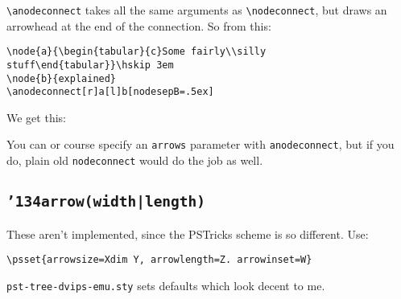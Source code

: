 \documentclass[12pt]{article}
\def\pstricks{PSTricks}
\def\bck{\char'134}
\begin{document}
\verb&\anodeconnect& takes all the same arguments as \verb&\nodeconnect&,
but draws an arrowhead at the end of the connection.  So from this:
\begin{example}
\begin{verbatim}
\node{a}{\begin{tabular}{c}Some fairly\\silly stuff\end{tabular}}\hskip 3em
\node{b}{explained}
\anodeconnect[r]a[l]b[nodesepB=.5ex]
\end{verbatim}
\end{example}
We get this:
You can or course specify an {\tt arrows} parameter with {\tt anodeconnect},
but if you do, plain old {\tt nodeconnect} would do the job as well.

\subsection{\tt \bck arrow(width|length)}
These aren't implemented, since the {\pstricks} scheme is so different.
Use:
\begin{example}
\begin{verbatim}
\psset{arrowsize=Xdim Y, arrowlength=Z. arrowinset=W}
\end{verbatim}
\end{example}
{\tt pst-tree-dvips-emu.sty} sets defaults which look decent to me.
\end{document}
